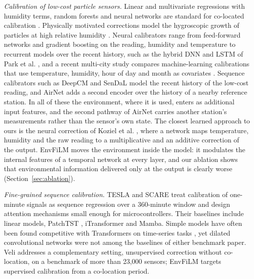 \documentclass[journal]{IEEEtran}
\begin{document}
\textit{Calibration of low-cost particle sensors.} Linear and multivariate regressions with humidity terms, random
forests and neural networks are standard for co-located calibration
\cite{zimmerman2018,malings2019,barkjohn2021,karagulian2019,concas2021}. Physically motivated corrections model the
hygroscopic growth of particles at high relative humidity \cite{diantonio2018,crilley2018,petters2007}. Neural
calibrators range from feed-forward networks and gradient boosting on the reading, humidity and temperature
\cite{si2020} to recurrent models over the recent history, such as the hybrid DNN and LSTM of Park et al.
\cite{park2021}, and a recent multi-city study compares machine-learning calibrations that use temperature,
humidity, hour of day and month as covariates \cite{wathore2026}. Sequence calibrators such as DeepCM
\cite{yu2020deepcm} and SenDaL \cite{ahn2024sendal} model the recent history of the low-cost reading, and AirNet
\cite{yu2020airnet} adds a second encoder over the history of a nearby reference station. In all of these the
environment, where it is used, enters as additional input features, and the second pathway of AirNet carries
another station's measurements rather than the sensor's own state. The closest learned approach
to ours is the neural correction of Koziel et al. \cite{koziel2025}, where a network maps temperature, humidity and the
raw reading to a multiplicative and an additive correction of the output. EnvFiLM moves the environment inside the
model: it modulates the internal features of a temporal network at every layer, and our ablation shows that
environmental information delivered only at the output is clearly worse (Section~\ref{sec:ablation}).

\textit{Fine-grained sequence calibration.} TESLA \cite{ahn2025} and SCARE \cite{yun2025} treat calibration of
one-minute signals as sequence regression over a 360-minute window and design attention mechanisms small enough for
microcontrollers. Their baselines include linear models, PatchTST \cite{nie2023}, iTransformer \cite{liu2024} and
Mamba. Simple models have often been found competitive with Transformers on time-series tasks \cite{zeng2023}, yet
dilated convolutional networks \cite{oord2016,bai2018} were not among the baselines of either benchmark paper.
Veli \cite{dalbah2026} addresses a complementary setting, unsupervised correction without co-location, on a
benchmark of more than 23,000 sensors; EnvFiLM targets supervised calibration from a co-location period.
\end{document}
